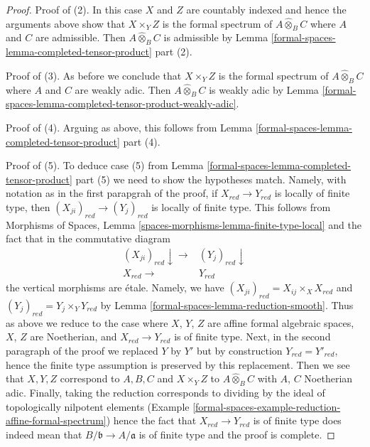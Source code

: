 \begin{proof}
\medskip\noindent
Proof of (2). In this case $X$ and $Z$ are countably indexed and
hence the arguments above show that $X \times_Y Z$ is the formal spectrum
of $A \widehat{\otimes}_B C$ where $A$ and $C$ are admissible.
Then $A \widehat{\otimes}_B C$ is admissible by
Lemma \ref{formal-spaces-lemma-completed-tensor-product} part (2).

\medskip\noindent
Proof of (3). As before we conclude that $X \times_Y Z$ is the formal spectrum
of $A \widehat{\otimes}_B C$ where $A$ and $C$ are weakly adic.
Then $A \widehat{\otimes}_B C$ is weakly adic by
Lemma \ref{formal-spaces-lemma-completed-tensor-product-weakly-adic}.

\medskip\noindent
Proof of (4). Arguing as above, this follows from
Lemma \ref{formal-spaces-lemma-completed-tensor-product} part (4).

\medskip\noindent
Proof of (5). To deduce case (5) from
Lemma \ref{formal-spaces-lemma-completed-tensor-product} part (5)
we need to show the hypotheses match.
Namely, with notation as in the first parapgrah of the proof,
if $X_{red} \to Y_{red}$ is locally of finite type, then
$(X_{ji})_{red} \to (Y_j)_{red}$ is locally of finite type. This follows
from Morphisms of Spaces, Lemma \ref{spaces-morphisms-lemma-finite-type-local}
and the fact that in the commutative diagram
$$
\begin{array}{cc}(X_{ji})_{red} \downarrow\longrightarrow & (Y_j)_{red} \downarrow \\ X_{red} \longrightarrow & Y_{red}\end{array}
$$
the vertical morphisms are \'etale. Namely, we have
$(X_{ji})_{red} = X_{ij} \times_X X_{red}$ and
$(Y_j)_{red} = Y_j \times_Y Y_{red}$
by Lemma \ref{formal-spaces-lemma-reduction-smooth}. Thus as above we reduce
to the case where $X$, $Y$, $Z$ are affine formal algebraic spaces,
$X$, $Z$ are Noetherian, and $X_{red} \to Y_{red}$ is of finite type.
Next, in the second paragraph of the proof we replaced $Y$ by $Y'$
but by construction $Y_{red} = Y'_{red}$, hence the finite type
assumption is preserved by this replacement. Then we see that
$X, Y, Z$ correspond to $A, B, C$ and $X \times_Y Z$ to
$A \widehat{\otimes}_B C$ with $A$, $C$ Noetherian adic.
Finally, taking the reduction corresponds to dividing by the
ideal of topologically nilpotent elements
(Example \ref{formal-spaces-example-reduction-affine-formal-spectrum})
hence the fact that $X_{red} \to Y_{red}$ is of finite type
does indeed mean that $B/\mathfrak b \to A/\mathfrak a$ is of finite type
and the proof is complete.
\end{proof}

